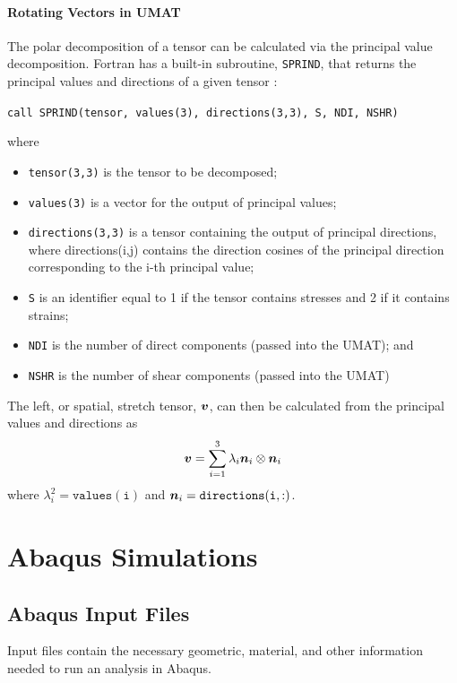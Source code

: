 \documentclass[10pt,letterpaper,oneside]{report}
\newcommand{\ten}[1]{\mbox{\boldmath $#1$}{}}
\begin{document}
\subsubsection{Rotating Vectors in UMAT}
The polar decomposition of a tensor can be calculated via the principal value decomposition.  Fortran has a built-in subroutine, \texttt{SPRIND}, that returns the principal values and directions of a given tensor :

\begin{center}
\texttt{call SPRIND(tensor, values(3), directions(3,3), S, NDI, NSHR)}
\end{center}

where 
\begin{itemize}
\item \texttt{tensor(3,3)} is the tensor to be decomposed;
\item \texttt{values(3)} is a vector for the output of principal values;
\item \texttt{directions(3,3)} is a tensor containing the output of principal directions, where directions(i,j) contains the direction cosines of the principal direction corresponding to the i-th principal value;
\item \texttt{S} is an identifier equal to 1 if the tensor contains stresses and 2 if it contains strains;
\item \texttt{NDI} is the number of direct components (passed into the UMAT); and
\item \texttt{NSHR} is the number of shear components (passed into the UMAT)
\end{itemize}

The left, or spatial, stretch tensor, $\ten{v}$, can then be calculated from the principal values and directions as 
\begin{align}
\ten{v} = \sum_{i=1}^3 \lambda_i \ten{n}_i \otimes \ten{n}_i
\end{align}
where $\lambda_i^2 = \mathtt{values(i)}$ and $\ten{n}_i = \mathtt{directions(i,:)}$.  



\chapter{Abaqus Simulations}

\section{Abaqus Input Files}
Input files contain the necessary geometric, material, and other information needed to run an analysis in Abaqus.  
\end{document}
